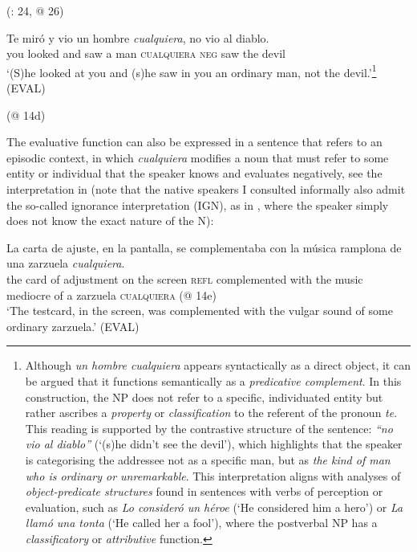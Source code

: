   (\citealt{Rizzosalierno2013}: 24, @ 26)
\z


\ea %
\label{bkm:Ref533953228}  \gll Te miró y vio un hombre \textit{cualquiera}, no vio al diablo.
\\
you looked and saw a man \textsc{cualquiera} \textsc{neg} saw the devil\\
  \glt ‘(S)he looked at you and (s)he saw in you an ordinary man, not the devil.’\footnote{Although \textit{un hombre cualquiera} appears syntactically as a direct object, it can be argued that it functions semantically as a \textit{predicative complement}. In this construction, the NP does not refer to a specific, individuated entity but rather ascribes a \textit{property} or \textit{classification} to the referent of the pronoun \textit{te}. This reading is supported by the contrastive structure of the sentence: \textit{“no vio al diablo”} (‘(s)he didn’t see the devil’), which highlights that the speaker is categorising the addressee not as a specific man, but as \textit{the kind of man who is ordinary or unremarkable}. This interpretation aligns with analyses of \textit{object-predicate structures} found in sentences with verbs of perception or evaluation, such as \textit{Lo consideró un héroe} (‘He considered him a hero’) or \textit{La llamó una tonta} (‘He called her a fool’), where the postverbal NP has a \textit{classificatory} or \textit{attributive} function.} (EVAL)

  (@ 14d)
\z


The evaluative function can also be expressed in a sentence that refers to an episodic context, in which \textit{cualquiera} modifies a noun that must refer to some entity or individual that the speaker knows and evaluates negatively, see the interpretation in  (note that the native speakers I consulted informally also admit the so-called ignorance interpretation (IGN), as in , where the speaker simply does not know the exact nature of the N):

\ea \label{bkm:Ref54686931}
\gll La carta de ajuste, en la pantalla, se complementaba con la música ramplona de una zarzuela \textit{cualquiera}.\\
the card of adjustment on the screen \textsc{refl} complemented with the music mediocre of a zarzuela \textsc{cualquiera} (@ 14e)\\

\ea \label{bkm:Ref54686931-1} ‘The testcard, in the screen, was complemented with the vulgar sound of some ordinary zarzuela.’   (EVAL)

